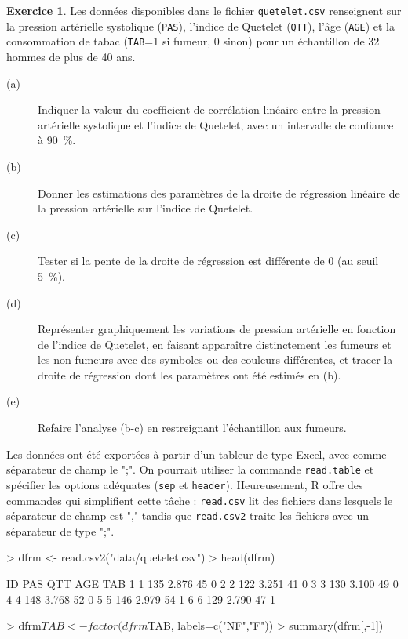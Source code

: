 \documentclass[11pt]{report}
\theoremstyle{definition}
\newtheorem{exo}{Exercice}[chapter]
\newcommand{\R}{\textsf{R}\xspace}
\begin{document}
\begin{exo}\label{exo:5.2}
Les données disponibles dans le fichier \texttt{quetelet.csv} renseignent
sur la pression artérielle systolique (\texttt{PAS}), l'indice de Quetelet
(\texttt{QTT}), l'âge (\texttt{AGE}) et la consommation de tabac
(\texttt{TAB}=1 si fumeur, 0 sinon) pour un échantillon de 32 hommes de plus
de 40 ans. 
\begin{description}
\item[(a)] Indiquer la valeur du coefficient de corrélation linéaire entre
  la pression artérielle systolique et l'indice de Quetelet, avec un
  intervalle de confiance à 90~\%.
\item[(b)] Donner les estimations des paramètres de la droite de régression
  linéaire de la pression artérielle sur l'indice de Quetelet.
\item[(c)] Tester si la pente de la droite de régression est différente de 0
  (au seuil 5~\%).
\item[(d)] Représenter graphiquement les variations de pression artérielle
  en fonction de l'indice de Quetelet, en faisant apparaître distinctement
  les fumeurs et les non-fumeurs avec des symboles ou des couleurs
  différentes, et tracer la droite de régression dont les paramètres ont été
  estimés en (b). 
\item[(e)] Refaire l'analyse (b-c) en restreignant l'échantillon aux
  fumeurs.
\end{description}
\begin{sol}
Les données ont été exportées à partir d'un tableur de type Excel, avec
comme séparateur de champ le ";". On pourrait utiliser la commande
\texttt{read.table} et spécifier les options adéquates (\texttt{sep} et
\texttt{header}). Heureusement, \R offre des commandes qui simplifient cette
tâche : \texttt{read.csv} lit des fichiers dans lesquels le séparateur de
champ est "," tandis que \texttt{read.csv2} traite les fichiers avec un
séparateur de type ";".
\begin{Schunk}
\begin{Sinput}
> dfrm <- read.csv2("data/quetelet.csv")
> head(dfrm)
\end{Sinput}
\begin{Soutput}
  ID PAS   QTT AGE TAB
1  1 135 2.876  45   0
2  2 122 3.251  41   0
3  3 130 3.100  49   0
4  4 148 3.768  52   0
5  5 146 2.979  54   1
6  6 129 2.790  47   1
\end{Soutput}
\begin{Sinput}
> dfrm$TAB <- factor(dfrm$TAB, labels=c("NF","F"))
> summary(dfrm[,-1])

\end{Sinput}
\end{Schunk}
\end{sol}
\end{exo}
\end{document}
